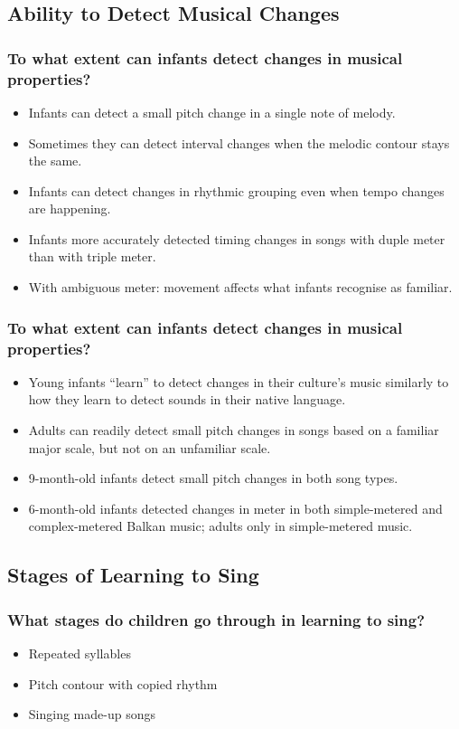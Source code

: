 \documentclass{beamer}
\begin{document}
\subsection*{Ability to Detect Musical Changes}

\begin{frame}
	\frametitle{To what extent can infants detect changes in musical properties?}
	\begin{itemize}
		\item Infants can detect a small pitch change in a single note of melody.
		\item Sometimes they can detect interval changes when the melodic contour stays the same.
		\item Infants can detect changes in rhythmic grouping even when tempo changes are happening.
		\item Infants more accurately detected timing changes in songs with duple meter than with triple meter.
		\item With ambiguous meter: movement affects what infants recognise as familiar.
	\end{itemize}
\end{frame}

\begin{frame}
	\frametitle{To what extent can infants detect changes in musical properties?}
	\begin{itemize}
		\item Young infants ``learn'' to detect changes in their culture's music similarly to how they learn to detect sounds in their native language.
		\item Adults can readily detect small pitch changes in songs based on a familiar major scale, but not on an unfamiliar scale.
		\pause
		\item 9-month-old infants detect small pitch changes in both song types.
		\item 6-month-old infants detected changes in meter in both simple-metered and complex-metered Balkan music; adults only in simple-metered music.
	\end{itemize}
\end{frame}

\subsection*{Stages of Learning to Sing}

\begin{frame}
	\frametitle{What stages do children go through in learning to sing?}
	\begin{itemize}
		\item Repeated syllables
		\item Pitch contour with copied rhythm
		\item Singing made-up songs
	\end{itemize}
\end{frame}
\end{document}
